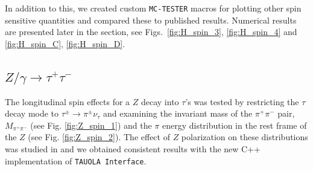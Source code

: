 \documentclass[]{Tauola_interface_design}
\begin{document}
In addition to this, we created custom {\tt MC-TESTER} 
macros for plotting other spin sensitive quantities and compared these to 
published results. Numerical results are presented later in the section, see Figs.~\ref{fig:H_spin_3}, \ref{fig:H_spin_4} and \ref{fig:H_spin_C}, \ref{fig:H_spin_D}.


\subsection{$Z/\gamma \rightarrow \tau^+ \tau^-$}
\label{mctester_results_z}

The longitudinal spin effects for a $Z$ decay into $\tau$'s was tested
by restricting the $\tau$ decay mode to $\tau^{\pm} \rightarrow \pi^{\pm} \nu_{\tau}$
and examining the invariant mass of the $\pi^+\pi^-$ pair, $M_{\pi^+\pi^-}$ 
(see Fig. \ref{fig:Z_spin_1}) and the $\pi$ energy distribution in the rest frame of 
the $Z$ (see Fig. \ref{fig:Z_spin_2}). The effect of $Z$ polarization on these distributions 
was studied in \cite{Pierzchala:2001gc} and we obtained consistent results with the new 
C++ implementation of {\tt TAUOLA Interface}.
\end{document}
